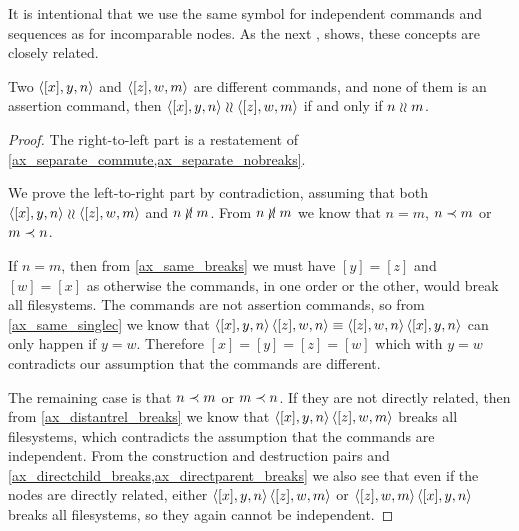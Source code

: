 It is intentional that we use the same symbol for independent commands
and sequences as for incomparable nodes. As the next
,
shows, these concepts are closely related.

\begin{mylem}
Two $\langle{[x],y,n}\rangle$ and $\langle{[z],w,m}\rangle$ are different commands,
and none of them is an assertion command, then
$\langle{[x],y,n}\rangle\mathrel{\wr\wr}\langle{[z],w,m}\rangle$ if and only if $n\mathrel{\wr\wr} m$.
\end{mylem}
\begin{proof}
The right-to-left part is a restatement of
\cref{ax_separate_commute,ax_separate_nobreaks}.

We prove the left-to-right part by contradiction,
assuming that both $\langle{[x],y,n}\rangle\mathrel{\wr\wr}\langle{[z],w,m}\rangle$ and $n\nunrel m$.
From $n\nunrel m$
we know that $n=m$, $n\prec m$ or $m\prec n$.

If $n=m$, then from \cref{ax_same_breaks} we must have $[y]=[z]$ and $[w]=[x]$
as otherwise the commands, in one order or the other, would break all filesystems.
The commands are not assertion commands, so from \cref{ax_same_singlec}
we know that $\langle{[x],y,n}\rangle\,\langle{[z],w,n}\rangle\equiv\langle{[z],w,n}\rangle\,\langle{[x],y,n}\rangle$ can only happen if $y=w$.
Therefore $[x]=[y]=[z]=[w]$ which with $y=w$ contradicts our assumption that the commands are different.

The remaining case is that $n\prec m$ or $m\prec n$.
If they are not directly related,
then from \cref{ax_distantrel_breaks} we know that
$\langle{[x],y,n}\rangle\,\langle{[z],w,m}\rangle$ breaks all filesystems,
which contradicts the assumption that the commands are independent.
From the construction and destruction pairs and 
\cref{ax_directchild_breaks,ax_directparent_breaks} we also see that
even if the nodes are directly related, either
$\langle{[x],y,n}\rangle\,\langle{[z],w,m}\rangle$ or $\langle{[z],w,m}\rangle\,\langle{[x],y,n}\rangle$ 
breaks all filesystems, so they again cannot be independent.
\end{proof}

